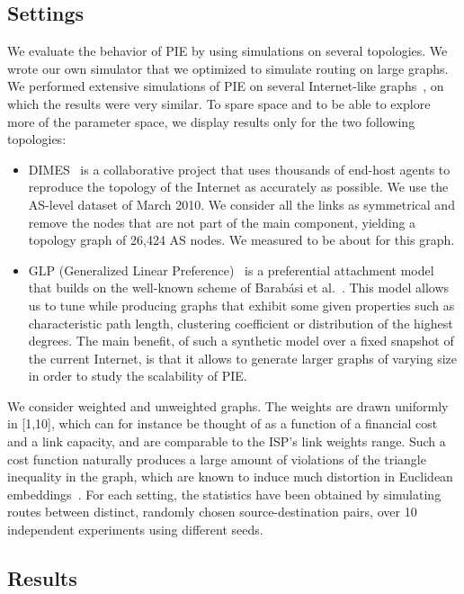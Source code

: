 \documentclass[conference]{IEEEtran}
\begin{document}
\subsection{Settings}
We evaluate the behavior of PIE by using simulations on several topologies. 
We wrote our own simulator that we optimized to simulate routing on large graphs. We performed extensive simulations of PIE on several Internet-like graphs~\cite{shavitt:dimes, bu02, barabasi:scaling, bianconi:fit, inet}, on which the results were very similar. To spare space and to be able to explore more of the parameter space, we display results only for the two following topologies:
\begin{itemize}
 \item DIMES~\cite{shavitt:dimes} is a collaborative project that uses thousands of end-host agents to reproduce the topology of the Internet as accurately as possible. We use the AS-level dataset of March 2010. We consider all the links as symmetrical and remove the nodes that are not part of the main component, yielding a topology graph of 26,424 AS nodes. We measured  to be about  for this graph.


\item GLP (Generalized Linear Preference)~\cite{bu02} is a preferential attachment model that builds on the well-known scheme of Barab\'{a}si et al.~\cite{barabasi:scaling}.
This model allows us to tune  while producing graphs that 
exhibit some given properties such as characteristic path length, clustering 
coefficient or distribution of the highest degrees. The main benefit, of such a synthetic model over a fixed snapshot of the current Internet, is that it allows to generate larger graphs of varying size in order to study the scalability of PIE.

\end{itemize}


We consider weighted and unweighted graphs. The weights are drawn uniformly in [1,10], which can for instance be thought of as a function of a financial cost and a link capacity, and are comparable to the ISP's link weights range. Such a cost function naturally produces a large amount of violations of the triangle inequality in the graph, which are known to induce much distortion in Euclidean embeddings~\cite{lee:euclidean}.
For each setting, the statistics have been obtained by simulating routes between  distinct, randomly chosen source-destination pairs, over 10 independent experiments using different seeds.


\subsection{Results}
\end{document}
